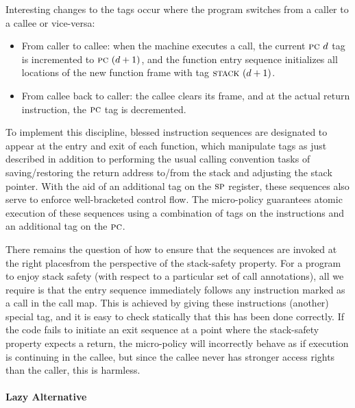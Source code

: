 \documentclass[10pt,conference]{ieeetran}%
\theoremstyle{definition}
\begin{document}
{Interesting changes to the tags occur where the program switches from
a caller to a callee or vice-versa:

\begin{itemize}

\item From caller to callee: when the machine executes a call,
  the current
  $\textsc{pc} ~ d$ tag is incremented to $\textsc{pc} ~ (d + 1)$, and the function
  entry sequence initializes  all locations of the new function frame with
  tag $\textsc{stack} ~ (d + 1)$.

\item From callee back to caller: the callee clears its frame, and at
  the actual return instruction,
  the $\textsc{pc}$ tag is decremented.
\end{itemize}

To implement this discipline, blessed instruction sequences are designated
to appear at the entry and exit of each function,
which manipulate tags as just described in addition to performing the
usual calling convention tasks of saving/restoring the return address to/from
the stack and adjusting the stack pointer. With the aid of an additional tag on
the $\textsc{sp}$ register, these sequences also serve to enforce
well-bracketed control flow.
The micro-policy guarantees atomic execution of these sequences
using a combination of tags on the instructions
and an additional tag on the $\textsc{pc}$.

There remains the question of how to ensure that the sequences are
invoked at the right places\ifspace from the perspective of the stack-safety
property\fi. For a program to enjoy stack safety
(with respect to a particular set of call annotations), all we require is that
the entry sequence immediately follows any instruction marked as a call
in the call map. This is achieved by giving these instructions (another) special tag,
and it is easy to check statically that this has been done correctly.
If the code fails to initiate an exit
sequence at a point where the stack-safety property expects a return,
the micro-policy will incorrectly behave as if execution
is continuing in the callee, but since the callee never has stronger access
rights than the caller, this is harmless.

\medskip
\paragraph*{Lazy Alternative}

}
\end{document}
